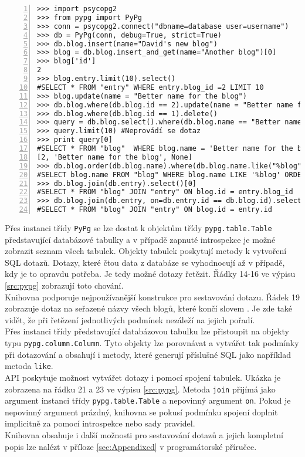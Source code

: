 \documentclass[ing,male,java,dept456]{diploma}						%
\begin{document}
\begin{lstlisting}[style=custompython, numbers=left, label=src:pypg, caption={Základy práce s knihovnou pypg}]
>>> import psycopg2
>>> from pypg import PyPg
>>> conn = psycopg2.connect("dbname=database user=username")
>>> db = PyPg(conn, debug=True, strict=True)
>>> db.blog.insert(name="David's new blog")
>>> blog = db.blog.insert_and_get(name="Another blog")[0]
>>> blog['id']
2
>>> blog.entry.limit(10).select()
#SELECT * FROM "entry" WHERE entry.blog_id =2 LIMIT 10
>>> blog.update(name = "Better name for the blog")
>>> db.blog.where(db.blog.id == 2).update(name = "Better name for the blog")
>>> db.blog.where(db.blog.id == 1).delete()
>>> query = db.blog.select().where(db.blog.name == "Better name for the blog") #Neprovádí se dotaz
>>> query.limit(10) #Neprovádí se dotaz
>>> print query[0]
#SELECT * FROM "blog"  WHERE blog.name = 'Better name for the blog' LIMIT 10
[2, 'Better name for the blog', None]
>>> db.blog.order(db.blog.name).where(db.blog.name.like("%blog")).select(db.blog.name)[0]
#SELECT blog.name FROM "blog" WHERE blog.name LIKE '%blog' ORDER BY blog.name
>>> db.blog.join(db.entry).select()[0]
#SELECT * FROM "blog" JOIN "entry" ON blog.id = entry.blog_id
>>> db.blog.join(db.entry, on=db.entry.id == db.blog.id).select()[0]
#SELECT * FROM "blog" JOIN "entry" ON blog.id = entry.id
\end{lstlisting}

Přes instanci třídy \lstinline[style=inlinepython]|PyPg| se lze dostat k objektům třídy \lstinline[style=inlinepython]|pypg.table.Table| představující databázové tabulky a v případě zapnuté introspekce je možné zobrazit seznam všech tabulek. Objekty tabulek poskytují metody k vytvoření SQL dotazů. Dotazy, které čtou data z databáze se vyhodnocují až v případě, kdy je to opravdu potřeba. Je tedy možné dotazy řetězit. Řádky 14-16 ve výpisu \ref{src:pypg} zobrazují toto chování. \\
Knihovna podporuje nejpoužívanější konstrukce pro sestavování dotazu. Řádek 19 zobrazuje dotaz na seřazené názvy všech blogů, které končí slovem . Je zde také vidět, že při řetězení jednotlivých podmínek nezáleží na jejich pořadí. \\
Přes instanci třídy představující databázovou tabulku lze přistoupit na objekty typu \lstinline[style=inlinepython]|pypg.column.Column|. Tyto objekty lze porovnávat a vytvářet tak podmínky při dotazování a obsahují i metody, které generují příslušné SQL jako například metoda \lstinline[style=inlinepython]|like|. \\
API poskytuje možnost vytvářet dotazy i pomocí spojení tabulek. Ukázka je zobrazena na řádku 21 a 23 ve výpisu \ref{src:pypg}. Metoda \lstinline[style=inlinepython]|join| přijímá jako argument instanci třídy \lstinline[style=inlinepython]|pypg.table.Table| a nepovinný argument \lstinline[style=inlinepython]|on|. Pokud je nepovinný argument prázdný, knihovna se pokusí podmínku spojení doplnit implicitně za pomocí introspekce nebo sady pravidel. \\
Knihovna obsahuje i další možnosti pro sestavování dotazů a jejich kompletní popis lze nalézt v příloze \ref{sec:Appendixcd} v programátorské příručce.
\end{document}
